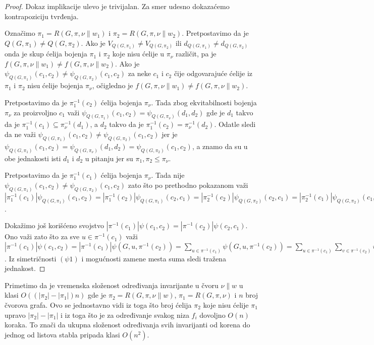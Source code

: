 \documentclass[12pt,oneside]{memoir}
\theoremstyle{definition}
\begin{document}
  \begin{proof}
	  Dokaz implikacije ulevo je trivijalan. Za smer udesno dokazaćemo
	  kontrapoziciju tvrđenja.

	  Označimo $\pi_1 = R(G, \pi, \nu \| w_1)$ i $\pi_2 = R(G, \pi, \nu \|
	  w_2)$. Pretpostavimo da je $Q(G, \pi_1) \neq Q(G, \pi_2)$. Ako je
	  $V_{Q(G, \pi_1)} \neq V_{Q(G, \pi_2)}$ ili $d_{Q(G, \pi_1)} \neq d_{Q(G,
	  \pi_2)}$ onda je skup ćelija bojenja $\pi_1$ i $\pi_2$ koje nisu ćelije u
	  $\pi_\nu$ različit, pa je $f(G, \pi, \nu \| w_1) \neq f(G, \pi, \nu \|
	  w_2)$. Ako je $\psi_{Q(G, \pi_1)}(c_1, c_2) \neq \psi_{Q(G, \pi_2)}(c_1,
	  c_2)$ za neke $c_1$ i $c_2$ čije odgovarajuće ćelije iz $\pi_1$ i $\pi_2$
	  nisu ćelije bojenja $\pi_\nu$, očigledno je $f(G, \pi, \nu \| w_1) \neq
	  f(G, \pi, \nu \| w_2)$.

	  Pretpostavimo da je $\pi_1^{-1}(c_2)$ ćelija bojenja $\pi_\nu$. Tada zbog
	  ekvitabilnosti bojenja $\pi_\nu$ za proizvoljno $c_1$ važi $\psi_{Q(G,
	  \pi_1)}(c_1, c_2) = \psi_{Q(G, \pi_\nu)}(d_1, d_2)$ gde je $d_1$ takvo da
	  je $\pi_1^{-1}(c_1) \subseteq \pi_\nu^{-1}(d_1)$, a $d_2$ takvo da je
	  $\pi_1^{-1}(c_2) = \pi_\nu^{-1}(d_2)$. Odatle sledi da ne važi
	  $\psi_{Q(G, \pi_1)}(c_1, c_2) \neq \psi_{Q(G, \pi_2)}(c_1, c_2)$ jer je
	  $\psi_{Q(G, \pi_1)}(c_1, c_2) = \psi_{Q(G, \pi_\nu)}(d_1, d_2) =
	  \psi_{Q(G, \pi_2)}(c_1, c_2)$, a znamo da su u obe jednakosti isti $d_1$
	  i $d_2$ u pitanju jer su $\pi_1, \pi_2 \leq \pi_\nu$.

	  Pretpostavimo da je $\pi_1^{-1}(c_1)$ ćelija bojenja $\pi_\nu$. Tada nije
	  $\psi_{Q(G, \pi_1)}(c_1, c_2) \neq \psi_{Q(G, \pi_2)}(c_1, c_2)$ zato što
	  po prethodno pokazanom važi $|\pi_1^{-1}(c_1)|\psi_{Q(G, \pi_1)}(c_1,
	  c_2) = |\pi_1^{-1}(c_2)|\psi_{Q(G, \pi_1)}(c_2, c_1) =
	  |\pi_2^{-1}(c_2)|\psi_{Q(G, \pi_2)}(c_2, c_1) =
	  |\pi_2^{-1}(c_1)|\psi_{Q(G, \pi_2)}(c_1, c_2)$.

	  Dokažimo još korišćeno svojstvo $|\pi^{-1}(c_1)|\psi(c_1, c_2) =
	  |\pi^{-1}(c_2)|\psi(c_2, c_1)$. Ono važi zato što za sve $u \in
	  \pi^{-1}(c_1)$ važi $|\pi^{-1}(c_1)|\psi(c_1, c_2) =
	  |\pi^{-1}(c_1)|\psi(G, u, \pi^{-1}(c_2)) = \sum_{u \in \pi^{-1}(c_1)}
	  \psi(G, u, \pi^{-1}(c_2)) = \sum_{u \in \pi^{-1}(c_1)} \sum_{v \in
	  \pi^{-1}(c_2)} \psi(G, u, v)$. Iz simetričnosti $(\psi1)$ i mogućnosti
	  zamene mesta suma sledi tražena jednakost.
  \end{proof}

  Primetimo da je vremenska složenost određivanja invarijante u čvoru $\nu \|
  w$ u klasi $O((|\pi_2| - |\pi_1|)n)$ gde je $\pi_2 = R(G, \pi, \nu \| w)$,
  $\pi_1 = R(G, \pi, \nu)$ i $n$ broj čvorova grafa. Ovo se jednostavno vidi iz
  toga što broj ćelija $\pi_2$ koje nisu ćelije $\pi_1$ upravo $|\pi_2| -
  |\pi_1|$ i iz toga što je za određivanje svakog niza $f_i$ dovoljno $O(n)$
  koraka. To znači da ukupna složenost određivanja svih invarijanti od korena
  do jednog od listova stabla pripada klasi $O(n^2)$.
\end{document}
